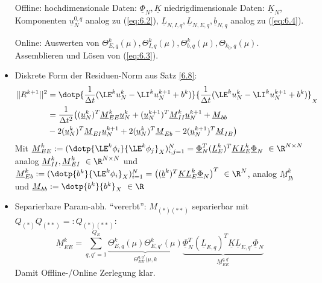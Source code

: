 \begin{itemize}
	Offline: hochdimensionale Daten: $\underline{\Phi}_N, \underline{K}$
	niedrigdimensionale Daten: $\underline{K}_N$, Komponenten $\underline{u}_N^{0,q}$ analog zu (\ref{eq:6.2}), $\underline{L}_{N,I,q}, \underline{L}_{N,E,q}, \underline{b}_{N,q}$ analog zu (\ref{eq:6.4}).
	
	Online: Auswerten von $\Theta_{E,q}^k(\mu), \Theta_{I,q}^k(\mu), \Theta_{b,q}^k(\mu), \Theta_{k_0,q}(\mu)$. Assemblieren und Lösen von (\ref{eq:6.3}).
	\item Diskrete Form der Residuen-Norm aus Satz \ref{6.8}:
	\begin{align*}
	||R^{k+1}||^2 &= \dotp{\frac{1}{\Delta t}(\LE^k u_N^k - \LI^k u_N^{k+1} + b^k)}{\frac{1}{\Delta t}(\LE^k u_N^k - \LI^k u_N^{k+1} + b^k)}_X \\
	&= \frac{1}{\Delta t^2} \big((\underline{u}_N^k)^T \underline{M}_{EE}^k \underline{u}_N^k + (\underline{u}_N^{k+1})^T \underline{M}_{II}^k \underline{u}_N^{k+1} + \underline{M}_{bb} \\ &- 2 (\underline{u}_N^k)^T \underline{M}_{EI} \underline{u}_N^{k+1} + 2 (\underline{u}_N^k)^T \underline{M}_{Eb} - 2 (\underline{u}_N^{k+1})^T\underline{M}_{IB}\big)
	\end{align*}
	Mit $\underline{M}_{EE}^k := (\dotp{\LE^k \phi_i}{\LE^k \phi_j}_X)_{i,j=1}^N = \underline{\Phi}_N^T (\underline{L}_E^k)^T \underline{K} \underline{L}_E^k \underline{\Phi}_N \,\, \in \R^{N \times N}$ analog $\underline{M}_{II}^k, \underline{M}_{EI}^k \,\, \in \R^{N \times N}$ und $\underline{M}_{Eb}^k := (\dotp{b^k}{\LE^k \phi_i}_X)_{i=1}^N = \big((\underline{b}^k)^T \underline{K} \underline{L}_E^k \underline{\Phi}_N \big)^T \,\, \in \R^N$, analog $\underline{M}_{Ib}^k$ und $\underline{M}_{bb} := \dotp{b^k}{b^k}_X \,\, \in \R$
	\item Separierbare Param-abh. ``vererbt'': $M_{(\ast)(\ast \ast)}$ separierbar mit $Q_{(\ast)}Q_{(\ast \ast)} =: Q_{(\ast)(\ast \ast)}:$
	\[
	\underline{M}_{EE}^k = \sum\limits_{q,q'=1}^{Q_E} \underbrace{\Theta_{E,q}^k(\mu)\Theta_{E,q'}^k(\mu)}_{\Theta_{EE}^{q,q'}(\mu,k} \underbrace{\underline{\Phi}_N^T(\underline{L}_{E,q})^T \underline{K} \underline{L}_{E,q'} \underline{\Phi}_N}_{\underline{M}_{EE}^{q,q'}}
	\]
	Damit Offline-/Online Zerlegung klar.
\end{itemize}

